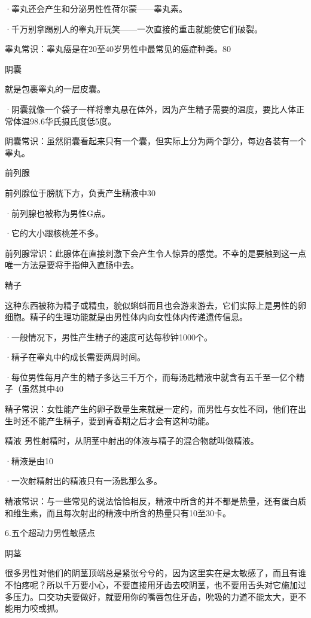 \documentclass[12pt,UTF8]{ctexbook}
\begin{document}
·睾丸还会产生和分泌男性性荷尔蒙——睾丸素。

·千万别拿踢别人的睾丸开玩笑——一次直接的重击就能使它们破裂。

睾丸常识：睾丸癌是在20至40岁男性中最常见的癌症种类。80%

阴囊

就是包裹睾丸的一层皮囊。

·阴囊就像一个袋子一样将睾丸悬在体外，因为产生精子需要的温度，要比人体正常体温98.6华氏摄氏度低5度。

阴囊常识：虽然阴囊看起来只有一个囊，但实际上分为两个部分，每边各装有一个睾丸。

前列腺

前列腺位于膀胱下方，负责产生精液中30%

·前列腺也被称为男性G点。

·它的大小跟核桃差不多。

前列腺常识：此腺体在直接刺激下会产生令人惊异的感觉。不幸的是要触到这一点唯一方法是要将手指伸入直肠中去。

精子

这种东西被称为精子或精虫，貌似蝌蚪而且也会游来游去，它们实际上是男性的卵细胞。精子的生理功能就是由男性体内向女性体内传递遗传信息。

·一般情况下，男性产生精子的速度可达每秒钟1000个。

·精子在睾丸中的成长需要两周时间。

·每位男性每月产生的精子多达三千万个，而每汤匙精液中就含有五千至一亿个精子（虽然其中40%

精子常识：女性能产生的卵子数量生来就是一定的，而男性与女性不同，他们在出生时还不能产生精子，要到青春期之后才会有这种功能。

精液
男性射精时，从阴茎中射出的体液与精子的混合物就叫做精液。

·精液是由10%

·一次射精射出的精液只有一汤匙那么多。

精液常识：与一些常见的说法恰恰相反，精液中所含的并不都是热量，还有蛋白质和维生素，而且每次射出的精液中所含的热量只有10至30卡。

6.五个超动力男性敏感点

阴茎

很多男性对他们的阴茎顶端总是紧张兮兮的，因为这里实在是太敏感了，而且有谁不怕疼呢？所以千万要小心，不要直接用牙齿去咬阴茎，也不要用舌头对它施加过多压力。口交功夫要做好，就要用你的嘴唇包住牙齿，吮吸的力道不能太大，更不能用力咬或抓。
\end{document}
